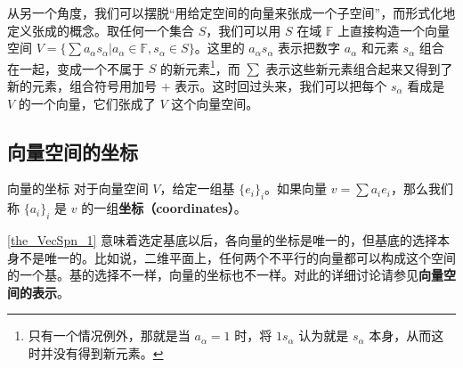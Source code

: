 从另一个角度，我们可以摆脱“用给定空间的向量来张成一个子空间”，而形式化地定义张成的概念。取任何一个集合 $S$，我们可以用 $S$ 在域 $\mathbb{F}$ 上直接构造一个向量空间 $V=\{\sum a_\alpha s_\alpha|a_\alpha\in\mathbb{F}, s_\alpha\in S\}$。这里的 $a_\alpha s_\alpha$ 表示把数字 $a_\alpha$ 和元素 $s_\alpha$ 组合在一起，变成一个不属于 $S$ 的新元素\footnote{只有一个情况例外，那就是当 $a_\alpha=1$ 时，将 $1s_\alpha$ 认为就是 $s_\alpha$ 本身，从而这时并没有得到新元素。}，而 $\sum$ 表示这些新元素组合起来又得到了新的元素，组合符号用加号 $+$ 表示。这时回过头来，我们可以把每个 $s_\alpha$ 看成是 $V$ 的一个向量，它们张成了 $V$ 这个向量空间。


\subsection{向量空间的坐标}



\begin{definition}{向量的坐标}
对于向量空间 $V$，给定一组基 $\{e_i\}_i$。如果向量 $v=\sum a_i e_i$，那么我们称 $\{a_i\}_i$ 是 $v$ 的一组\textbf{坐标（coordinates）}。
\end{definition}

\autoref{the_VecSpn_1} 意味着选定基底以后，各向量的坐标是唯一的，但基底的选择本身不是唯一的。比如说，二维平面上，任何两个不平行的向量都可以构成这个空间的一个基。基的选择不一样，向量的坐标也不一样。对此的详细讨论请参见\textbf{向量空间的表示}。







% 


